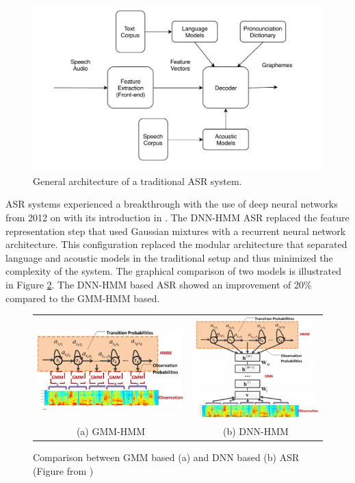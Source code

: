 \begin{figure}[t]
  \centering
  \includegraphics[width=0.8\linewidth]{img/asr2.pdf}
  \caption{General architecture of a traditional ASR system.}
  \label{sota:asr_schema}
\end{figure}

ASR systems experienced a breakthrough with the use of deep neural networks from 2012 on with its introduction in \cite{asr_dnnhmm}. The DNN-HMM ASR replaced the feature representation step that used Gaussian mixtures with a recurrent neural network architecture. This configuration replaced the modular architecture that separated language and acoustic models in the traditional setup and thus minimized the complexity of the system. The graphical comparison of two models is illustrated in Figure \ref{sota:gmm-dnn-hmm}. The DNN-HMM based ASR showed an improvement of 20\% compared to the GMM-HMM based. 

\begin{figure}
\begin{tabular}{cc}
  \includegraphics[width=0.5\linewidth]{img/gmm-hmm.png} &   \includegraphics[width=0.5\linewidth]{img/dnn-hmm.png} \\
(a) GMM-HMM & (b) DNN-HMM\\[6pt]
\end{tabular}
\caption{Comparison between GMM based (a) and DNN based (b) ASR (Figure from \cite{asr_dnnhmm})}
\label{sota:gmm-dnn-hmm}
\end{figure}

